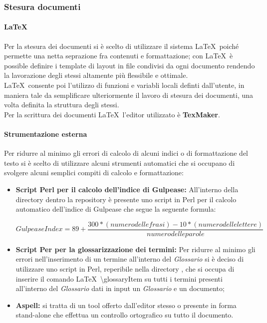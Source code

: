     \subsubsection{Stesura documenti}
      \paragraph{\LaTeX}
        Per la stesura dei documenti si è scelto di utilizzare il sistema \LaTeX\ poiché permette una netta seprazione fra contenuti
        e formattazione; con \LaTeX\ è possible definire i template di layout in file condivisi da ogni documento rendendo la lavorazione
        degli stessi altamente più flessibile e ottimale.\\
        \LaTeX\ consente poi l'utilizzo di funzioni e variabli locali definti dall'utente, in maniera tale da semplificare ulteriormente
        il lavoro di stesura dei documenti, una volta definita la struttura degli stessi.\\
        Per la scrittura dei documenti \LaTeX\ l'editor utilizzato è \textbf{TexMaker}.
      \paragraph{Strumentazione esterna}
        Per ridurre al minimo gli errori di calcolo di alcuni indici o di formattazione del testo si è scelto di utilizzare alcuni strumenti
        automatici che si occupano di svolgere alcuni semplici compiti di calcolo e formattazione:
        \begin{itemize}
          \item \textbf{Script Perl per il calcolo dell'indice di Gulpease: }All'interno della directory  dentro la repository è presente
          uno script in Perl per il calcolo automatico dell'indice di Gulpease che segue la seguente formula:
          \begin{center}
            \begin{equation}
              Gulpease Index = 89+\frac{300*( numero delle frasi ) - 10*( numero delle lettere )}{numero delle parole}
            \end{equation}
          \end{center}
          \item \textbf{Script Per per la glossarizzazione dei termini: }Per ridurre al minimo gli errori nell'inserimento di un termine all'interno
          del \emph{Glossario} si è deciso di utilizzare uno script in Perl, reperibile nella directory , che si occupa di inserire
          il comando \LaTeX\ \textbackslash glossaryItem{} su tutti i termini presenti all'interno del \emph{Glossario} dati in input un \emph{Glossario}
          e un documento;
          \item \textbf{Aspell: }si tratta di un tool offerto dall'editor stesso o presente in forma stand-alone che effettua un controllo ortografico
          su tutto il documento.
        \end{itemize}
